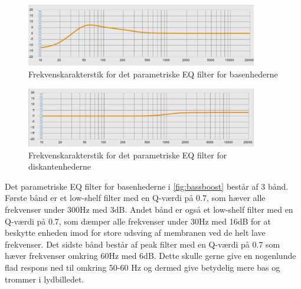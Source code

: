 \begin{figure}[H]
	\center
	\includegraphics[width=0.9\textwidth]{figur/bassboost}
	\caption{Frekvenskarakterstik for det parametriske EQ filter for basenhederne}
	\label{fig:bassboost}
\end{figure}

\begin{figure}[H]
	\center
	\includegraphics[width=0.9\textwidth]{figur/diskantboost}
	\caption{Frekvenskarakterstik for det parametriske EQ filter for diskantenhederne}
	\label{fig:diskantboost}
\end{figure}

Det parametriske EQ filter for basenhederne i \autoref{fig:bassboost} består af 3 bånd. Første bånd er et low-shelf filter med en Q-værdi på 0.7, som hæver alle frekvenser under 300Hz med 3dB. Andet bånd er også et low-shelf filter med en Q-værdi på 0.7, som dæmper alle frekvenser under 30Hz med 16dB for at beskytte enheden imod for store udsving af membranen ved de helt lave frekvenser. Det sidste bånd består af peak filter med en Q-værdi på 0.7 som hæver frekvenser omkring 60Hz med 6dB. Dette skulle gerne give en nogenlunde flad respons ned til omkring 50-60 Hz og dermed give betydelig mere bas og trommer i lydbilledet. 

